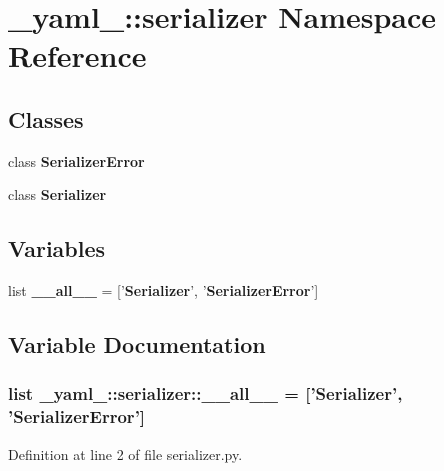 \section{\_\-yaml\_\-::serializer Namespace Reference}
\label{namespace__yaml___1_1serializer}


\subsection*{Classes}
\begin{CompactItemize}
\item 
class {\bf SerializerError}
\item 
class {\bf Serializer}
\end{CompactItemize}
\subsection*{Variables}
\begin{CompactItemize}
\item 
list {\bf \_\-\_\-all\_\-\_\-} = ['{\bf Serializer}', '{\bf SerializerError}']
\end{CompactItemize}


\subsection{Variable Documentation}
\subsubsection{\setlength{\rightskip}{0pt plus 5cm}list {\bf \_\-yaml\_\-::serializer::\_\-\_\-all\_\-\_\-} = ['{\bf Serializer}', '{\bf SerializerError}']\hspace{0.3cm}{\tt  [static]}}\label{namespace__yaml___1_1serializer_fd75b72eb5d5598a309a6cd93eddd9ec}




Definition at line 2 of file serializer.py.